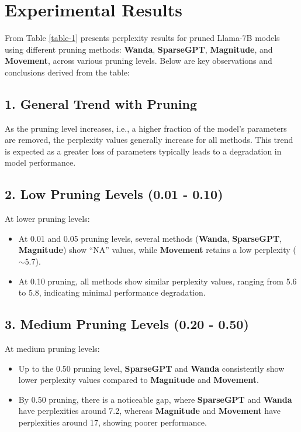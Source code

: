 \documentclass{article} %
\begin{document}
\section{Experimental Results}
\label{res}

From Table \ref{table-1} presents perplexity results for pruned Llama-7B models using different pruning methods: \textbf{Wanda}, \textbf{SparseGPT}, \textbf{Magnitude}, and \textbf{Movement}, across various pruning levels. Below are key observations and conclusions derived from the table:

\subsection*{1. General Trend with Pruning}
As the pruning level increases, i.e., a higher fraction of the model's parameters are removed, the perplexity values generally increase for all methods. This trend is expected as a greater loss of parameters typically leads to a degradation in model performance.

\subsection*{2. Low Pruning Levels (0.01 - 0.10)}
At lower pruning levels:
\begin{itemize}
    \item At 0.01 and 0.05 pruning levels, several methods (\textbf{Wanda}, \textbf{SparseGPT}, \textbf{Magnitude}) show ``NA'' values, while \textbf{Movement} retains a low perplexity ($\sim$5.7).
    \item At 0.10 pruning, all methods show similar perplexity values, ranging from 5.6 to 5.8, indicating minimal performance degradation.
\end{itemize}

\subsection*{3. Medium Pruning Levels (0.20 - 0.50)}
At medium pruning levels:
\begin{itemize}
    \item Up to the 0.50 pruning level, \textbf{SparseGPT} and \textbf{Wanda} consistently show lower perplexity values compared to \textbf{Magnitude} and \textbf{Movement}.
    \item By 0.50 pruning, there is a noticeable gap, where \textbf{SparseGPT} and \textbf{Wanda} have perplexities around 7.2, whereas \textbf{Magnitude} and \textbf{Movement} have perplexities around 17, showing poorer performance.
\end{itemize}
\end{document}
